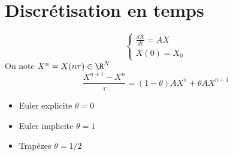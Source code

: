 \documentclass{article}
\begin{document}
\section{Discr\'etisation en temps}
\begin{equation}
\left\{
  \begin{array}{ll}
		  \frac{d X}{dt} = A X \\
		  X(0) = X_0
  \end{array}
\right.
\end{equation}
On note $X^n = X(n\tau) \in \R^N$
$$
\frac{X^{n+1} - X^n}{\tau} = (1-\theta)AX^n + \theta A X^{n+1}
$$
\begin{itemize}
		\item Euler explicite $\theta = 0$
		\item Euler implicite $\theta = 1$
		\item Trap\`ezes $\theta = 1/2$
\end{itemize}
\bigskip
\end{document}
